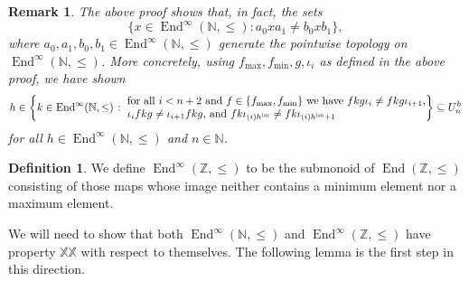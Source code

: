 \documentclass[11pt]{amsart}
\makeatletter
\newtheorem{remark}[theorem]{Remark}
\theoremstyle{definition}
\newtheorem{definition}[theorem]{Definition}
\newcommand{\N}{\mathbb N}
\newcommand{\Z}{\mathbb Z}
\newcommand{\im}{\operatorname{im}}
\newcommand{\makeset}[2]{\left\lbrace #1 \; \colon\;
 \begin{tabular}{@{}l@{}}
   #2
  \end{tabular}
  \right\rbrace}
\makeatother
\begin{document}
\begin{remark}\label{magenta2}
The above proof shows that, in fact, the sets $$\{x\in \operatorname{End}^\infty(\N,\leq): a_0xa_1\neq b_0xb_1\},$$ where $a_0,a_1,b_0,b_1\in \operatorname{End}^\infty(\N,\leq)$ generate the pointwise topology on $\operatorname{End}^\infty(\N,\leq)$. 
 More concretely, using \(f_{\max}, f_{\min}, g, \iota_i\) as defined in the above proof, we have shown
 \[h\in\makeset{k\in \operatorname{End}^\infty(\N,\leq)}{for all \(i<n+2\) and \(f\in \{f_{\max}, f_{\min}\}\) we have \(f kg \iota_i\neq f kg \iota_{i+1}\),\\ \(\iota_i fkg \neq \iota_{i+1} fkg\),  and \(fk\iota_{(i)h^{\im}}\neq fk\iota_{(i)h^{\im}+1}\)
 } \subseteq U_{n}^{h}\]
 for all \(h\in\operatorname{End}^\infty(\N,\leq) \) and \(n\in \N\).
\end{remark}

\begin{definition}
    We define $\operatorname{End}^\infty(\Z,\leq)$ to be the submonoid of $\operatorname{End}(\Z,\leq)$ consisting of those maps whose image neither contains a minimum element nor a maximum element.
\end{definition}

We will need to show that both \(\operatorname{End}^\infty(\mathbb{N},\leq)\) and \(\operatorname{End}^\infty(\mathbb{Z},\leq)\) have property \(\mathbb{XX}\) with respect to themselves.  The following lemma is the first step in this direction.
\end{document}
